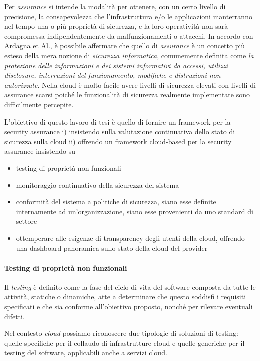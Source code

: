 \documentclass[../main.tex]{subfiles}
\begin{document}
Per \textit{assurance} si intende la modalità per ottenere, con un certo livello di precisione, la consapevolezza che l'infrastruttura e/o le applicazioni manterranno nel tempo una o più proprietà di sicurezza, e la loro operatività non sarà compromessa indipendentemente da malfunzionamenti o attacchi\cite{goertzel2007software}.
In accordo con Ardagna et Al.\cite{Ardagna:2015:SAC:2808687.2767005}, è possibile affermare che quello di \textit{assurance} è un concetto più esteso della mera nozione di \textit{sicurezza informatica}, comunemente definita come \textit{la protezione delle informazioni e dei sistemi informativi da accessi, utilizzi disclosure, interruzioni del funzionamento, modifiche e distruzioni non autorizzate}.
Nella cloud è molto facile avere livelli di sicurezza elevati con livelli di assurance scarsi poiché le funzionalità di sicurezza realmente implementate sono difficilmente percepite. 


L'obiettivo di questo lavoro di tesi è quello di fornire un framework per la security assurance i) insistendo sulla valutazione continuativa dello stato di sicurezza sulla cloud ii) offrendo un framework cloud-based per la security assurance insistendo su
\begin{itemize}
    \item testing di proprietà non funzionali
    \item monitoraggio continuativo della sicurezza del sistema
    \item conformità del sistema a politiche di sicurezza, siano esse definite internamente ad un'organizzazione, siano esse provenienti da uno standard di settore 
    \item ottemperare alle esigenze di transparency degli utenti della cloud, offrendo una dashboard panoramica sullo stato della cloud del provider
\end{itemize}

\paragraph{Testing di proprietà non funzionali}

Il \textit{testing} è definito come la fase del ciclo di vita del software composta da tutte le attività, statiche o dinamiche, atte a determinare che questo soddisfi i requisiti specificati e che sia conforme all'obiettivo proposto, nonché per rilevare eventuali difetti.%


Nel contesto \textit{cloud} possiamo riconoscere due tipologie di soluzioni di testing: quelle specifiche per il collaudo di infrastrutture cloud e quelle generiche per il testing del software, applicabili anche a servizi cloud.
\end{document}
